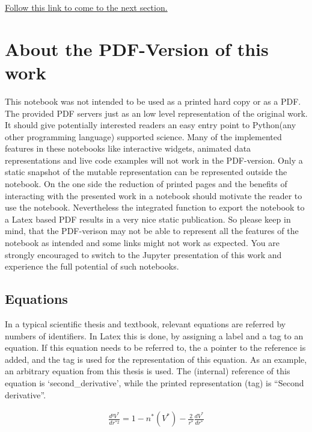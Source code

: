 \documentclass[11pt]{article}
\begin{document}
\href{2-SMOX-sensor-calculation.ipynb}{Follow this link to come to the
next section.}

    \hypertarget{about-the-pdf-version-of-this-work}{%
\section{About the PDF-Version of this
work}\label{about-the-pdf-version-of-this-work}}

This notebook was not intended to be used as a printed hard copy or as a
PDF. The provided PDF servers just as an low level representation of the
original work. It should give potentially interested readers an easy
entry point to Python(any other programming language) supported science.
Many of the implemented features in these notebooks like interactive
widgets, animated data representations and live code examples will not
work in the PDF-version. Only a static snapshot of the mutable
representation can be represented outside the notebook. On the one side
the reduction of printed pages and the benefits of interacting with the
presented work in a notebook should motivate the reader to use the
notebook. Nevertheless the integrated function to export the notebook to
a Latex based PDF results in a very nice static publication. So please
keep in mind, that the PDF-verison may not be able to represent all the
features of the notebook as intended and some links might not work as
expected. You are strongly encouraged to switch to the Jupyter
presentation of this work and experience the full potential of such
notebooks.

\hypertarget{equations}{%
\subsection{Equations}\label{equations}}

In a typical scientific thesis and textbook, relevant equations are
referred by numbers of identifiers. In Latex this is done, by assigning
a label and a tag to an equation. If this equation needs to be referred
to, the a pointer to the reference is added, and the tag is used for the
representation of this equation. As an example, an arbitrary equation
from this thesis is used. The (internal) reference of this equation is
`second\_derivative', while the printed representation (tag) is ``Second
derivative''.

\begin{align}
\frac{d²V^{*}}{dr^{*2}}=1-n^{*}(V^{*})-\frac{2}{r^{*}}\frac{dV^{*}}{dr^{*}}\label{second_derivative}\tag{Second derivative}
\end{align}
\end{document}
